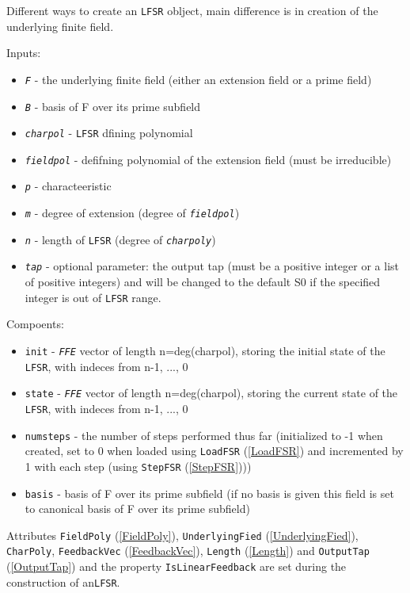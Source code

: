 \documentclass[a4paper,11pt]{report}
\begin{document}
{{{ Different ways to create an \texttt{LFSR} oblject, main difference is in creation of the underlying finite field. 

 Inputs: 
\begin{itemize}
\item  \mbox{\texttt{\mdseries\slshape F}} - the underlying finite field (either an extension field or a prime field)
\item  \mbox{\texttt{\mdseries\slshape B}} - basis of F over its prime subfield
\item  \mbox{\texttt{\mdseries\slshape charpol}} - \texttt{LFSR} dfining polynomial 
\item  \mbox{\texttt{\mdseries\slshape fieldpol}} - defifning polynomial of the extension field (must be irreducible)
\item  \mbox{\texttt{\mdseries\slshape p}} - characteeristic 
\item  \mbox{\texttt{\mdseries\slshape m}} - degree of extension (degree of \mbox{\texttt{\mdseries\slshape fieldpol}}) 
\item  \mbox{\texttt{\mdseries\slshape n}} - length of \texttt{LFSR} (degree of \mbox{\texttt{\mdseries\slshape charpoly}})
\item  \mbox{\texttt{\mdseries\slshape tap}} - optional parameter: the output tap (must be a positive integer or a list of
positive integers) and will be changed to the default S{\textunderscore}0 if
the specified integer is out of \texttt{LFSR} range.
\end{itemize}
 Compoents: 
\begin{itemize}
\item  \texttt{init} - \mbox{\texttt{\mdseries\slshape FFE}} vector of length n=deg(charpol), storing the initial state of the \texttt{LFSR}, with indeces from n-1, ..., 0
\item  \texttt{state} - \mbox{\texttt{\mdseries\slshape FFE}} vector of length n=deg(charpol), storing the current state of the \texttt{LFSR}, with indeces from n-1, ..., 0
\item  \texttt{numsteps} - the number of steps performed thus far (initialized to -1 when created, set
to 0 when loaded using \texttt{LoadFSR} (\ref{LoadFSR}) and incremented by 1 with each step (using \texttt{StepFSR} (\ref{StepFSR}))) 
\item  \texttt{basis} - basis of F over its prime subfield (if no basis is given this field is set
to canonical basis of F over its prime subfield) 
\end{itemize}
 Attributes \texttt{FieldPoly} (\ref{FieldPoly}), \texttt{UnderlyingFied} (\ref{UnderlyingFied}), \texttt{CharPoly}, \texttt{FeedbackVec} (\ref{FeedbackVec}), \texttt{Length} (\ref{Length}) and \texttt{OutputTap} (\ref{OutputTap}) and the property \texttt{IsLinearFeedback} are set during the construction of an\texttt{LFSR}. 

}}}
\end{document}
